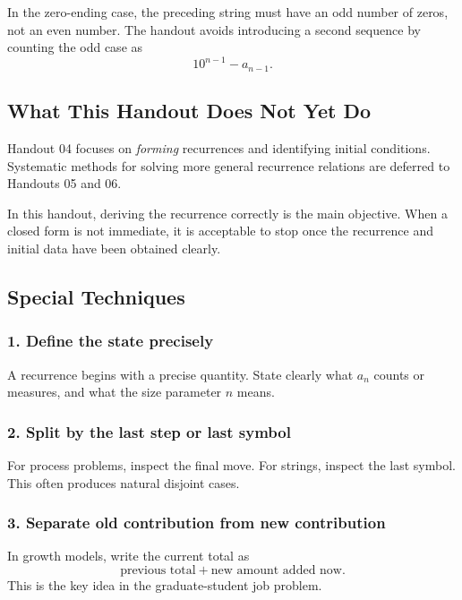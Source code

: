 \begin{commonmistake}[title={Forgetting the complement count}]
In the zero-ending case, the preceding string must have an odd number of zeros, not an even number. The handout avoids introducing a second sequence by counting the odd case as
\[
10^{n-1}-a_{n-1}.
\]
\end{commonmistake}

\subsection{What This Handout Does Not Yet Do}

Handout 04 focuses on \emph{forming} recurrences and identifying initial conditions. Systematic methods for solving more general recurrence relations are deferred to Handouts 05 and 06.

\begin{examtip}[title={Scope boundary}]
In this handout, deriving the recurrence correctly is the main objective. When a closed form is not immediate, it is acceptable to stop once the recurrence and initial data have been obtained clearly.
\end{examtip}

\subsection{Special Techniques}

\subsubsection*{1. Define the state precisely}
A recurrence begins with a precise quantity. State clearly what $a_n$ counts or measures, and what the size parameter $n$ means.

\subsubsection*{2. Split by the last step or last symbol}
For process problems, inspect the final move. For strings, inspect the last symbol. This often produces natural disjoint cases.

\subsubsection*{3. Separate old contribution from new contribution}
In growth models, write the current total as
\[
\text{previous total} + \text{new amount added now}.
\]
This is the key idea in the graduate-student job problem.

